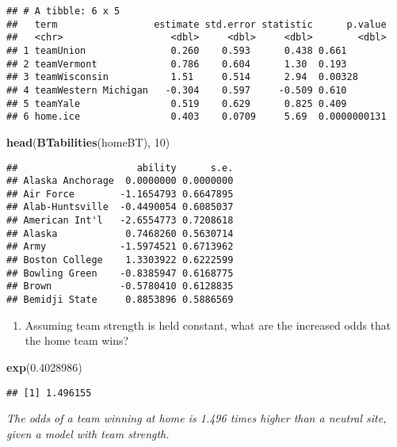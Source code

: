 \documentclass[]{article}
\newenvironment{Shaded}{\begin{snugshade}}{\end{snugshade}}
\newcommand{\DecValTok}[1]{\textcolor[rgb]{0.00,0.00,0.81}{#1}}
\newcommand{\FloatTok}[1]{\textcolor[rgb]{0.00,0.00,0.81}{#1}}
\newcommand{\KeywordTok}[1]{\textcolor[rgb]{0.13,0.29,0.53}{\textbf{#1}}}
\newcommand{\NormalTok}[1]{#1}
\providecommand{\tightlist}{%
  \setlength{\itemsep}{0pt}\setlength{\parskip}{0pt}}
\begin{document}
\begin{verbatim}
## # A tibble: 6 x 5
##   term                 estimate std.error statistic      p.value
##   <chr>                   <dbl>     <dbl>     <dbl>        <dbl>
## 1 teamUnion               0.260    0.593      0.438 0.661       
## 2 teamVermont             0.786    0.604      1.30  0.193       
## 3 teamWisconsin           1.51     0.514      2.94  0.00328     
## 4 teamWestern Michigan   -0.304    0.597     -0.509 0.610       
## 5 teamYale                0.519    0.629      0.825 0.409       
## 6 home.ice                0.403    0.0709     5.69  0.0000000131
\end{verbatim}

\begin{Shaded}
\begin{Highlighting}[]
\KeywordTok{head}\NormalTok{(}\KeywordTok{BTabilities}\NormalTok{(homeBT), }\DecValTok{10}\NormalTok{)}
\end{Highlighting}
\end{Shaded}

\begin{verbatim}
##                     ability      s.e.
## Alaska Anchorage  0.0000000 0.0000000
## Air Force        -1.1654793 0.6647895
## Alab-Huntsville  -0.4490054 0.6085037
## American Int'l   -2.6554773 0.7208618
## Alaska            0.7468260 0.5630714
## Army             -1.5974521 0.6713962
## Boston College    1.3303922 0.6222599
## Bowling Green    -0.8385947 0.6168775
## Brown            -0.5780410 0.6128835
## Bemidji State     0.8853896 0.5886569
\end{verbatim}

\begin{enumerate}
\def\labelenumi{\arabic{enumi}.}
\tightlist
\item
  Assuming team strength is held constant, what are the increased odds
  that the home team wins?
\end{enumerate}

\begin{Shaded}
\begin{Highlighting}[]
\KeywordTok{exp}\NormalTok{(}\FloatTok{0.4028986}\NormalTok{)}
\end{Highlighting}
\end{Shaded}

\begin{verbatim}
## [1] 1.496155
\end{verbatim}

\emph{The odds of a team winning at home is 1.496 times higher than a
neutral site, given a model with team strength.}
\end{document}
